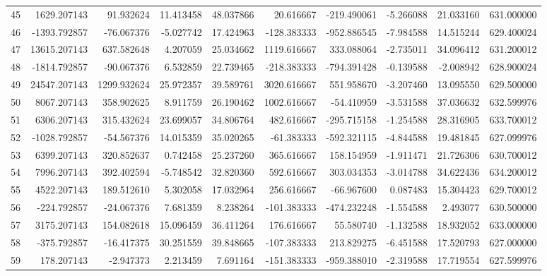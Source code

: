 \begin{tabular}{lrrrrrrrrr}
45  &   1629.207143 &    91.932624 &  11.413458 &  48.037866 &    20.616667 &  -219.490061 &  -5.266088 &  21.033160 &  631.000000 \\
46  &  -1393.792857 &   -76.067376 &  -5.027742 &  17.424963 &  -128.383333 &  -952.886545 &  -7.984588 &  14.515244 &  629.400024 \\
47  &  13615.207143 &   637.582648 &   4.207059 &  25.034662 &  1119.616667 &   333.088064 &  -2.735011 &  34.096412 &  631.200012 \\
48  &  -1814.792857 &   -90.067376 &   6.532859 &  22.739465 &  -218.383333 &  -794.391428 &  -0.139588 &  -2.008942 &  628.900024 \\
49  &  24547.207143 &  1299.932624 &  25.972357 &  39.589761 &  3020.616667 &   551.958670 &  -3.207460 &  13.095550 &  629.500000 \\
50  &   8067.207143 &   358.902625 &   8.911759 &  26.190462 &  1002.616667 &   -54.410959 &  -3.531588 &  37.036632 &  632.599976 \\
51  &   6306.207143 &   315.432624 &  23.699057 &  34.806764 &   482.616667 &  -295.715158 &  -1.254588 &  28.316905 &  633.700012 \\
52  &  -1028.792857 &   -54.567376 &  14.015359 &  35.020265 &   -61.383333 &  -592.321115 &  -4.844588 &  19.481845 &  627.099976 \\
53  &   6399.207143 &   320.852637 &   0.742458 &  25.237260 &   365.616667 &   158.154959 &  -1.911471 &  21.726306 &  630.700012 \\
54  &   7996.207143 &   392.402594 &  -5.748542 &  32.820360 &   592.616667 &   303.034353 &  -3.014788 &  34.622436 &  634.200012 \\
55  &   4522.207143 &   189.512610 &   5.302058 &  17.032964 &   256.616667 &   -66.967600 &   0.087483 &  15.304423 &  629.700012 \\
56  &   -224.792857 &   -24.067376 &   7.681359 &   8.238264 &  -101.383333 &  -474.232248 &  -1.554588 &   2.493077 &  630.500000 \\
57  &   3175.207143 &   154.082618 &  15.096459 &  36.411264 &   176.616667 &    55.580740 &  -1.132588 &  18.932052 &  633.000000 \\
58  &   -375.792857 &   -16.417375 &  30.251559 &  39.848665 &  -107.383333 &   213.829275 &  -6.451588 &  17.520793 &  627.000000 \\
59  &    178.207143 &    -2.947373 &   2.213459 &   7.691164 &  -151.383333 &  -959.388010 &  -2.319588 &  17.719554 &  627.599976 \\

\end{tabular}
